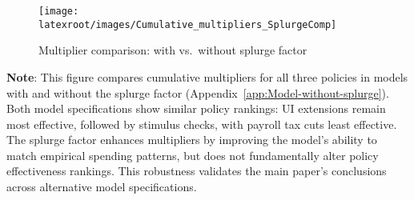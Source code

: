 \documentclass{econsocart}
\begin{document}
\begin{figure}[H]
  \centering
  \caption{Multiplier comparison: with vs.\ without splurge factor}
  \label{fig:cumulativemultipliers_SplurgeComp} 
  \texttt{[image: \\latexroot/images/Cumulative\_multipliers\_SplurgeComp]}
\end{figure}
\noindent\parbox{\textwidth}{\footnotesize
  \textbf{Note}: This figure compares cumulative multipliers for all three policies
  in models with and without the splurge factor (Appendix~\ref{app:Model-without-splurge}).
  Both model specifications show similar policy rankings: UI extensions remain most effective,
  followed by stimulus checks, with payroll tax cuts least effective.
  The splurge factor enhances multipliers by improving the model's ability to match
  empirical spending patterns, but does not fundamentally alter policy effectiveness rankings.
  This robustness validates the main paper's conclusions across alternative model specifications.
}

\vspace{1em}  %
\end{document}
